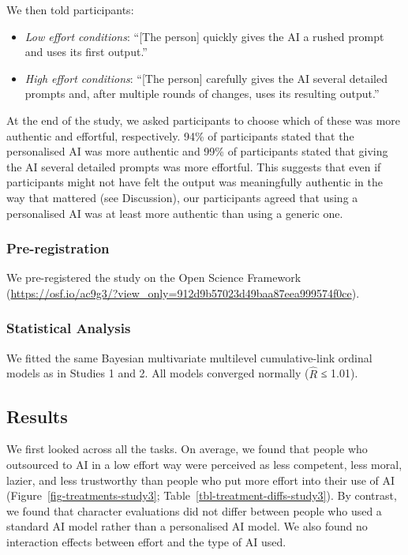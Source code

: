 \documentclass[
  man,
  floatsintext,
  longtable,
  nolmodern,
  notxfonts,
  notimes,
  colorlinks=true,linkcolor=blue,citecolor=blue,urlcolor=blue]{apa7}
\providecommand{\tightlist}{%
  \setlength{\itemsep}{0pt}\setlength{\parskip}{0pt}}
\begin{document}
We then told participants:

\begin{itemize}
\tightlist
\item
  \emph{Low effort conditions}: ``{[}The person{]} quickly gives the AI
  a rushed prompt and uses its first output.''
\item
  \emph{High effort conditions}: ``{[}The person{]} carefully gives the
  AI several detailed prompts and, after multiple rounds of changes,
  uses its resulting output.''
\end{itemize}

At the end of the study, we asked participants to choose which of these
was more authentic and effortful, respectively. 94\% of participants
stated that the personalised AI was more authentic and 99\% of
participants stated that giving the AI several detailed prompts was more
effortful. This suggests that even if participants might not have felt
the output was meaningfully authentic in the way that mattered (see
Discussion), our participants agreed that using a personalised AI was at
least more authentic than using a generic one.

\subsubsection*{Pre-registration}\label{pre-registration-2}

We pre-registered the study on the Open Science Framework
(\url{https://osf.io/ac9g3/?view_only=912d9b57023d49baa87eea999574f0ce}).

\subsubsection*{Statistical Analysis}\label{statistical-analysis-2}

We fitted the same Bayesian multivariate multilevel cumulative-link
ordinal models as in Studies 1 and 2. All models converged normally
(\(\hat{R}\) ≤ 1.01).

\subsection*{Results}\label{results-2}

We first looked across all the tasks. On average, we found that people
who outsourced to AI in a low effort way were perceived as less
competent, less moral, lazier, and less trustworthy than people who put
more effort into their use of AI (Figure~\ref{fig-treatments-study3};
Table~\ref{tbl-treatment-diffs-study3}). By contrast, we found that
character evaluations did not differ between people who used a standard
AI model rather than a personalised AI model. We also found no
interaction effects between effort and the type of AI used.
\end{document}
